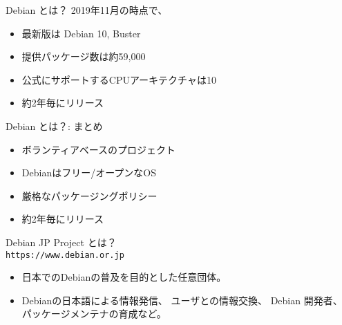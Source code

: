 \documentclass[cjk,c,squeeze,shrink,dvipdfmx,12pt]{beamer}
\begin{document}
\begin{frame}[fragile]{Debian とは？}
  2019年11月の時点で、
  \pause
  \begin{itemize}[<+->]
  \item
    最新版は {\alert{Debian 10}}, Buster
  \item
    提供パッケージ数は{\alert{約59,000}}
  \item
    公式にサポートするCPUアーキテクチャは{\alert{10}}
  \item {\alert{約2年毎}}にリリース
  \end{itemize}
\end{frame}



\begin{frame}[fragile]{Debian とは？: まとめ}
  \pause
  \begin{itemize}[<+->]
  \item ボランティアベースのプロジェクト
  \item Debianはフリー/オープンなOS
  \item 厳格なパッケージングポリシー
  \item 約2年毎にリリース
   \end{itemize}
\end{frame}

\begin{frame}[fragile]{Debian JP Project とは？\\[-.5em]{\normalsize{\texttt{https://www.debian.or.jp}}}}
  \pause
  \begin{itemize}[<+->]
  \item 日本でのDebianの普及を目的とした任意団体。
  \item %
    Debianの日本語による情報発信、
    ユーザとの情報交換、
    Debian 開発者、
    パッケージメンテナの育成など。
  \end{itemize}
\end{frame}
\end{document}
